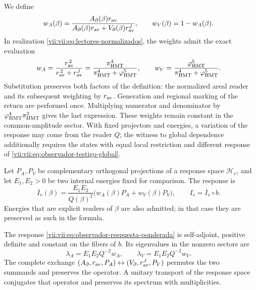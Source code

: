 We define
\[
 w_A(\beta)=
 \frac{A_\partial(\beta)r_{\rm av}}
 {A_\partial(\beta)r_{\rm av}+V_\partial(\beta)r_{\rm av}^{J}},
 \qquad w_V(\beta)=1-w_A(\beta).
\]
In realization \eqref{vii:vii:eq:lectores-normalizados}, the weights
admit the exact evaluation
\begin{equation}
 w_A=\frac{r_{\rm av}^{\,2}}{r_{\rm av}^{\,2}+r_{\rm av}^{J}}
     =\frac{\pi_{\rm HMT}^{4}}
            {\pi_{\rm HMT}^{4}+\varphi_{\rm HMT}^{5}},\qquad
 w_V=\frac{\varphi_{\rm HMT}^{5}}
            {\pi_{\rm HMT}^{4}+\varphi_{\rm HMT}^{5}}.
 \label{vii:vii:eq:pesos-amplitud-comun}
\end{equation}
Substitution preserves both factors of the definition: the normalized
areal reader and its subsequent weighting by \(r_{\rm av}\).
Generation and regional marking of the return are performed once.
Multiplying numerator
and denominator by \(\varphi_{\rm HMT}^4\pi_{\rm HMT}^2\)
gives the last expression. These weights remain constant in the
common-amplitude sector. With fixed projectors and energies, a
variation of the response may come from the reader \(Q\);
the witness to global dependence additionally requires the states with
equal local restriction and different response of
\eqref{vii:vii:eq:observador-testigo-global}.


Let \(P_A,P_V\) be complementary orthogonal projections of a
response space \(\mathcal H_v\), and let \(E_1,E_2>0\) be
two internal energies fixed for comparison. The response is
\begin{equation}
 \overline I_v(\beta)=\frac{E_1E_2}{Q(\beta)^2}
       \bigl(w_A(\beta)P_A+w_V(\beta)P_V\bigr),
 \qquad I_v=\overline I_v\circ b.
 \label{vii:vii:eq:observador-respuesta-ponderada}
\end{equation}
Energies that are explicit readers of
\(\beta\) are also admitted; in that case they are preserved as such in the formula.

\begin{proposition}
\label{vii:vii:prop:observador-respuesta-positiva}
The response \eqref{vii:vii:eq:observador-respuesta-ponderada} is
self-adjoint, positive definite and constant on the fibers of \(b\).
Its eigenvalues in the nonzero sectors are
\[
 \lambda_A=E_1E_2Q^{-2}w_A,\qquad
 \lambda_V=E_1E_2Q^{-2}w_V.
\]
The complete exchange
\((A_\partial,r_{\rm av},P_A)
 \leftrightarrow(V_\partial,r_{\rm av}^{J},P_V)\)
permutes the two summands and preserves the operator. A unitary
transport of the response space conjugates that operator and preserves
its spectrum with multiplicities.
\end{proposition}

